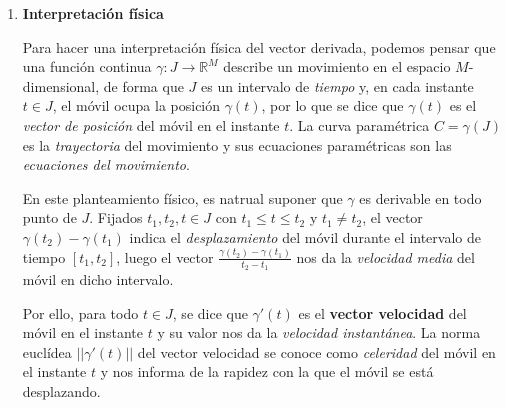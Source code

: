 \documentclass[a4paper, 12pt]{article}
\begin{document}
\begin{enumerate}[label=\textbf{\arabic*}.]
\begin{enumerate}
\bigskip

\item \textbf{Interpretación física}

Para hacer una interpretación física del vector derivada, podemos pensar que una función continua \(\gamma: J \to \mathbb{R}^M\) describe un movimiento en el espacio \(M\)-dimensional, de forma que \(J\) es un intervalo de \textit{tiempo} y, en cada instante \(t \in J\), el móvil ocupa la posición \(\gamma(t)\), por lo que se dice que \(\gamma(t)\) es el \textit{vector de posición} del móvil en el instante \(t\). La curva paramétrica \(C = \gamma (J)\) es la \textit{trayectoria} del movimiento y sus ecuaciones paramétricas son las \textit{ecuaciones del movimiento}.

En este planteamiento físico, es natrual suponer que \(\gamma\) es derivable en todo punto de \(J\). Fijados \(t_1, t_2, t \in J\) con \(t_1 \leq t \leq t_2\) y \(t_1 \neq t_2\), el vector \(\gamma(t_2) - \gamma(t_1)\) indica el \textit{desplazamiento} del móvil durante el intervalo de tiempo \([t_1, t_2]\), luego el vector \(\frac{\gamma(t_2) - \gamma(t_1)}{t_2 - t_1}\) nos da la \textit{velocidad media} del móvil en dicho intervalo.

Por ello, para todo \(t \in J\), se dice que \(\gamma' (t)\) es el \textbf{vector velocidad} del móvil en el instante \(t\) y su valor nos da la \textit{velocidad instantánea}. La norma euclídea \(|| \gamma' (t)||\) del vector velocidad se conoce como \textit{celeridad} del móvil en el instante \(t\) y nos informa de la rapidez con la que el móvil se está desplazando.
\end{enumerate}
\end{enumerate}
\end{document}
